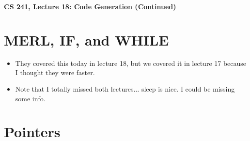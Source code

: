 \documentclass[12pt]{article}
\author{Clement Tsang}
\begin{document}
\begin{center}
    \Large\textbf{CS 241, Lecture 18: Code Generation (Continued)}
\end{center}


\section{MERL, IF, and WHILE}
\begin{itemize}
    \item They covered this today in lecture 18, but we covered it in lecture 17 because I thought they were faster.
    \item Note that I totally missed both lectures$\dots$ sleep is nice.  I could be missing some info.
\end{itemize}

\section{Pointers}
\end{document}
